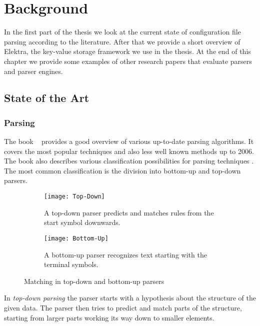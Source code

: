 \chapter{Background}
\label{sec:background}

In the first part of the thesis we look at the current state of configuration file parsing according to the literature. After that we provide a short overview of Elektra, the key-value storage framework we use in the thesis. At the end of this chapter we provide some examples of other research papers that evaluate parsers and parser engines.

\section{State of the Art}
\label{sec:state_of_the_art}

\subsection{Parsing}
\label{sec:parsing}

The book ~\cite{grune2008parsing} provides a good overview of various up-to-date parsing algorithms. It covers the most popular techniques and also less well known methods up to 2006. The book also describes various classification possibilities for parsing techniques \cite[p. 85]{grune2008parsing}. The most common classification is the division into bottom-up and top-down parsers.

\begin{figure}
  \centering
  \begin{subfigure}[t]{.48\textwidth}
    \texttt{[image: Top-Down]}
    \caption{A top-down parser predicts and matches rules from the start symbol downwards.}
  \end{subfigure}
  \quad
  \begin{subfigure}[t]{.48\textwidth}
    \texttt{[image: Bottom-Up]}
    \caption{A bottom-up parser recognizes text starting with the terminal symbols.}
  \end{subfigure}
  \caption{Matching in top-down and bottom-up parsers}
\end{figure}

In \emph{top-down parsing} the parser starts with a hypothesis about the structure of the given data. The parser then tries to predict and match parts of the structure, starting from larger parts working its way down to smaller elements.


